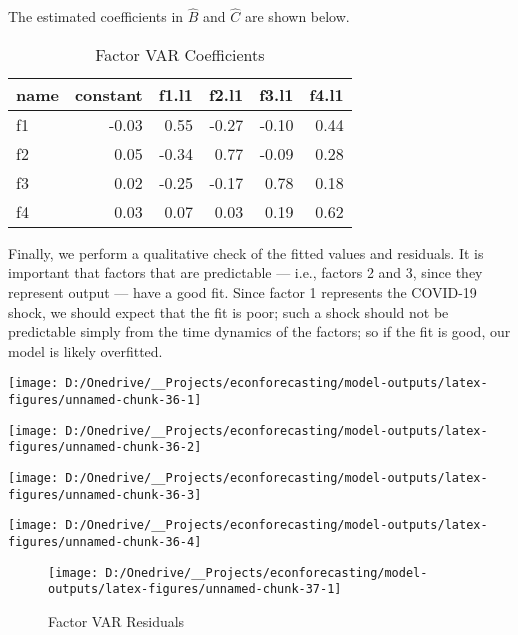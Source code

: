 \documentclass[11pt, letterpaper]{article}\usepackage[]{graphicx}\usepackage[]{color}
\begin{document}
The estimated coefficients in $\widehat{B}$ and $\widehat{C}$ are shown below.
\begin{table}[H]
\centering
\begingroup\footnotesize
\begin{tabular}{lrrrrr}
  \hline
name & constant & f1.l1 & f2.l1 & f3.l1 & f4.l1 \\ 
  \hline
f1 & -0.03 & 0.55 & -0.27 & -0.10 & 0.44 \\ 
  f2 & 0.05 & -0.34 & 0.77 & -0.09 & 0.28 \\ 
  f3 & 0.02 & -0.25 & -0.17 & 0.78 & 0.18 \\ 
  f4 & 0.03 & 0.07 & 0.03 & 0.19 & 0.62 \\ 
   \hline
\end{tabular}
\endgroup
\caption{Factor VAR Coefficients} 
\end{table}



Finally, we perform a qualitative check of the fitted values and residuals. It is important that factors that are predictable --- i.e., factors 2 and 3, since they represent output --- have a good fit. Since factor 1 represents the COVID-19 shock, we should expect that the fit is poor; such a shock should not be predictable simply from the time dynamics of the factors; so if the fit is good, our model is likely overfitted.


{\centering \texttt{[image: D:/Onedrive/\_\_Projects/econforecasting/model-outputs/latex-figures/unnamed-chunk-36-1]} 

}




{\centering \texttt{[image: D:/Onedrive/\_\_Projects/econforecasting/model-outputs/latex-figures/unnamed-chunk-36-2]} 

}




{\centering \texttt{[image: D:/Onedrive/\_\_Projects/econforecasting/model-outputs/latex-figures/unnamed-chunk-36-3]} 

}




{\centering \texttt{[image: D:/Onedrive/\_\_Projects/econforecasting/model-outputs/latex-figures/unnamed-chunk-36-4]} 

}





\begin{figure}[H]

{\centering \texttt{[image: D:/Onedrive/\_\_Projects/econforecasting/model-outputs/latex-figures/unnamed-chunk-37-1]} 

}

\caption[Factor VAR Residuals]{Factor VAR Residuals}\label{fig:unnamed-chunk-37}
\end{figure}
\end{document}

